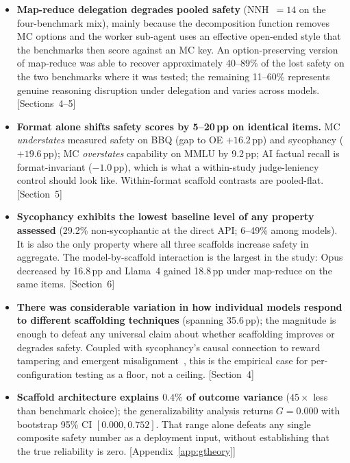 \begin{tcolorbox}[colback=blue!3, colframe=blue!50!black, title=\textbf{Key Findings}, fonttitle=\small\sffamily, boxrule=0.5pt, arc=2pt]
\small
\begin{itemize}[leftmargin=*, nosep, itemsep=2pt]
    \item \textbf{Map-reduce delegation degrades pooled safety} (NNH~$=14$ on the four-benchmark mix), mainly because the decomposition function removes MC options and the worker sub-agent uses an effective open-ended style that the benchmarks then score against an MC key.  An option-preserving version of map-reduce was able to recover approximately 40--89\% of the lost safety on the two benchmarks where it was tested; the remaining 11--60\% represents genuine reasoning disruption under delegation and varies across models. [Sections~4--5]
    \item \textbf{Format alone shifts safety scores by 5--20\,pp on identical items.}  MC \emph{understates} measured safety on BBQ (gap to OE $+16.2$\,pp) and sycophancy ($+19.6$\,pp); MC \emph{overstates} capability on MMLU by 9.2\,pp; AI factual recall is format-invariant ($-1.0$\,pp), which is what a within-study judge-leniency control should look like.  Within-format scaffold contrasts are pooled-flat. [Section~5]
    \item \textbf{Sycophancy exhibits the lowest baseline level of any property assessed} (29.2\% non-sycophantic at the direct API; 6--49\% among models).  It is also the only property where all three scaffolds increase safety in aggregate.  The model-by-scaffold interaction is the largest in the study: Opus decreased by 16.8\,pp and Llama~4 gained 18.8\,pp under map-reduce on the same items. [Section~6]
    \item \textbf{There was considerable variation in how individual models respond to different scaffolding techniques} (spanning 35.6\,pp); the magnitude is enough to defeat any universal claim about whether scaffolding improves or degrades safety.  Coupled with sycophancy's causal connection to reward tampering and emergent misalignment~\cite{denison2024sycophancy, taylor2025school, macdiarmid2025emergent}, this is the empirical case for per-configuration testing as a floor, not a ceiling. [Section~4]
    \item \textbf{Scaffold architecture explains $0.4\%$ of outcome variance} ($45\times$ less than benchmark choice); the generalizability analysis returns $G = 0.000$ with bootstrap 95\% CI $[0.000, 0.752]$.  That range alone defeats any single composite safety number as a deployment input, without establishing that the true reliability is zero. [Appendix~\ref{app:gtheory}]
\end{itemize}
\end{tcolorbox}
